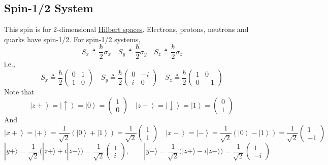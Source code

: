 \documentclass[
]{article}
\let\oldhyperref\hyperref
\renewcommand{\hyperref}[2][]{\oldhyperref[#1]{\underline{#2}}}
\providecommand{\ket}[1]{\left\lvert #1 \right\rangle}
\begin{document}
\subsection{Spin-1/2 System}\label{spin-12-systems}
This spin is for 2-dimensional \hyperref[hilbert-spaces]{Hilbert spaces}.
Electrons, protons, neutrons and quarks have spin-1/2.
For spin-1/2 systems,
\[
	S_x\triangleq\frac{\hbar}{2}\sigma_x\quad
	S_y\triangleq\frac{\hbar}{2}\sigma_y\quad
	S_z\triangleq\frac{\hbar}{2}\sigma_z
\]
i.e.,
\[
	S_x\triangleq\frac{\hbar}{2}\begin{pmatrix}0 & 1\\ 1 & 0\end{pmatrix}\quad
	S_y\triangleq\frac{\hbar}{2}\begin{pmatrix}0 & -i\\ i & 0\end{pmatrix}\quad
	S_z\triangleq\frac{\hbar}{2}\begin{pmatrix}1 & 0\\ 0 & -1\end{pmatrix}
\]
Note that
\[
	\ket{z+}=\ket{\uparrow} = \ket{0}=\begin{pmatrix}1 \\ 0\end{pmatrix}\quad
	\ket{z-}=\ket{\downarrow} = \ket{1}=\begin{pmatrix}0 \\ 1\end{pmatrix}
\]
And
\[
	\ket{x+}=\ket{+}=\frac{1}{\sqrt{2}}(\ket{0}+\ket{1})=\frac{1}{\sqrt{2}}\begin{pmatrix}1 \\ 1\end{pmatrix}\quad
	\ket{x-}=\ket{-}=\frac{1}{\sqrt{2}}(\ket{0}-\ket{1})=\frac{1}{\sqrt{2}}\begin{pmatrix}1 \\ -1\end{pmatrix}
\]
\[
	|y+\rangle = \frac{1}{\sqrt{2}}\big(|z+\rangle + i|z-\rangle\big) = \frac{1}{\sqrt{2}}\begin{pmatrix} 1 \\ i \end{pmatrix}, \qquad |y-\rangle = \frac{1}{\sqrt{2}}\big(|z+\rangle - i|z-\rangle\big) = \frac{1}{\sqrt{2}}\begin{pmatrix} 1 \\ -i \end{pmatrix}
\]
\end{document}
